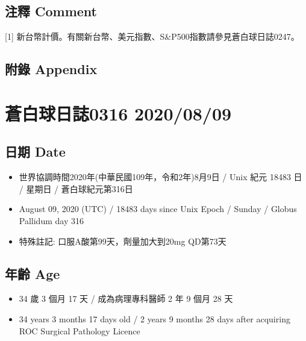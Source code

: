 \documentclass[a5paper, 11pt
]{book}
\providecommand{\tightlist}{%
  \setlength{\itemsep}{0pt}\setlength{\parskip}{0pt}}
\begin{document}
\hypertarget{ux6ce8ux91cb-comment-68}{%
\subsection{注釋 Comment}\label{ux6ce8ux91cb-comment-68}}

{[}1{]}
新台幣計價。有關新台幣、美元指數、S\&P500指數請參見蒼白球日誌0247。

\hypertarget{ux9644ux9304-appendix-68}{%
\subsection{附錄 Appendix}\label{ux9644ux9304-appendix-68}}

\hypertarget{ux84bcux767dux7403ux65e5ux8a8c0316-20200809}{%
\section{蒼白球日誌0316
2020/08/09}\label{ux84bcux767dux7403ux65e5ux8a8c0316-20200809}}

\hypertarget{ux65e5ux671f-date-69}{%
\subsection{日期 Date}\label{ux65e5ux671f-date-69}}

\begin{itemize}
\tightlist
\item
  世界協調時間2020年(中華民國109年，令和2年)8月9日 / Unix 紀元 18483 日
  / 星期日 / 蒼白球紀元第316日
\item
  August 09, 2020 (UTC) / 18483 days since Unix Epoch / Sunday / Globus
  Pallidum day 316
\item
  特殊註記: 口服A酸第99天，劑量加大到20mg QD第73天
\end{itemize}

\hypertarget{ux5e74ux9f61-age-69}{%
\subsection{年齡 Age}\label{ux5e74ux9f61-age-69}}

\begin{itemize}
\tightlist
\item
  34 歲 3 個月 17 天 / 成為病理專科醫師 2 年 9 個月 28 天
\item
  34 years 3 months 17 days old / 2 years 9 months 28 days after
  acquiring ROC Surgical Pathology Licence
\end{itemize}
\end{document}
